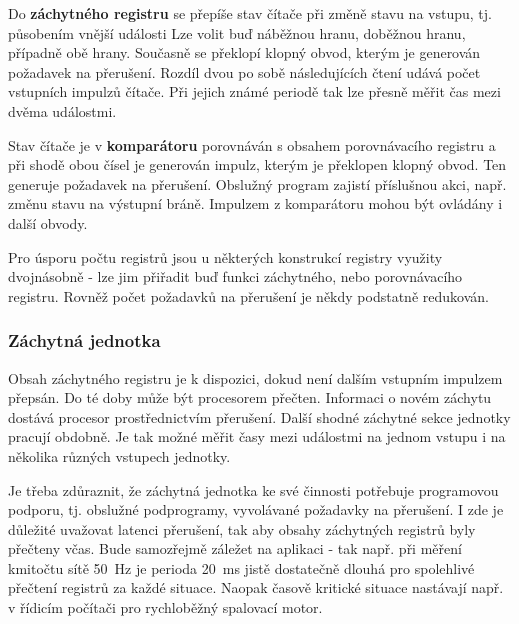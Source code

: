       Do \textbf{záchytného registru} se přepíše stav čítače při změně stavu na vstupu, tj. 
      působením vnější události Lze volit buď náběžnou hranu, doběžnou hranu, případně obě hrany. 
      Současně se překlopí klopný obvod, kterým je generován požadavek na přerušení. Rozdíl dvou po 
      sobě následujících čtení udává počet vstupních impulzů čítače. Při jejich známé periodě tak 
      lze přesně měřit čas mezi dvěma událostmi.
      
      Stav čítače je v \textbf{komparátoru} porovnáván s obsahem porovnávacího registru a při shodě 
      obou čísel je generován impulz, kterým je překlopen klopný obvod. Ten generuje požadavek na 
      přerušení. Obslužný program zajistí příslušnou akci, např. změnu stavu na výstupní 
      bráně. Impulzem z komparátoru mohou být ovládány i další obvody.
      
      Pro úsporu počtu registrů jsou u některých konstrukcí registry využity dvojnásobně - lze jim 
      přiřadit buď funkci záchytného, nebo porovnávacího registru. Rovněž počet požadavků na 
      přerušení je někdy podstatně redukován.

      \subsubsection{Záchytná jednotka}
        Obsah záchytného registru je k dispozici, dokud není dalším vstupním impulzem přepsán. Do 
        té doby může být procesorem přečten. Informaci o novém záchytu dostává procesor 
        prostřednictvím přerušení. Další shodné záchytné sekce jednotky pracují obdobně. Je tak 
        možné měřit časy mezi událostmi na jednom vstupu i na několika různých vstupech jednotky.
        
        Je třeba zdůraznit, že záchytná jednotka ke své činnosti potřebuje programovou podporu, tj. 
        obslužné podprogramy, vyvolávané požadavky na přerušení. I zde je důležité uvažovat latenci 
        přerušení, tak aby  obsahy záchytných registrů byly přečteny včas. Bude samozřejmě záležet 
        na aplikaci - tak např. při měření kmitočtu sítě \qty{50}{\hertz} je perioda 
        \qty{20}{\milli\second} jistě dostatečně dlouhá pro spolehlivé přečtení registrů za každé 
        situace. Naopak časově kritické situace nastávají např. v řídicím počítači pro rychloběžný 
        spalovací motor.
        
